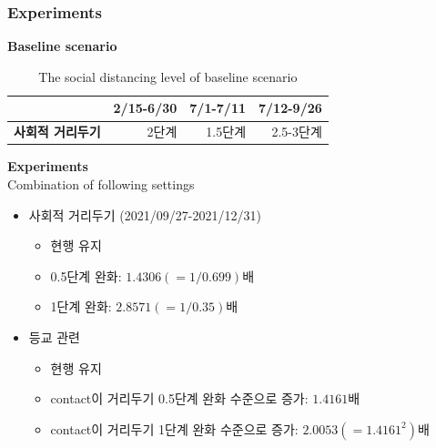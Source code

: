 \documentclass[aspectratio=169, 9pt, xcolor=dvipsnames]{beamer}
\begin{document}
	\begin{frame}\frametitle{Experiments}
		\textbf{Baseline scenario}
	    \begin{table}
	    	\begin{tabular}{crrr}
	    		\toprule
	    		 & \textbf{2/15-6/30} & \textbf{7/1-7/11} & \textbf{7/12-9/26} \\
	    		\midrule
	    		\textbf{사회적 거리두기} & 2단계 & 1.5단계 & 2.5-3단계 \\
	    		\bottomrule
	    	\end{tabular}
	    	\caption{The social distancing level of baseline scenario}
	    \end{table}
	    \textbf{Experiments} \\
	    Combination of following settings
	    \begin{itemize}
	    	\item 사회적 거리두기 (2021/09/27-2021/12/31)
	    	\begin{itemize}
	    		\item 현행 유지
	    		\item 0.5단계 완화: $1.4306(=1/0.699)$배
	    		\item 1단계 완화: $2.8571(=1/0.35)$배
	    	\end{itemize}
	    	\item 등교 관련
	    	\begin{itemize}
	    		\item 현행 유지
	    		\item contact이 거리두기 0.5단계 완화 수준으로 증가: $1.4161$배
	    		\item contact이 거리두기 1단계 완화 수준으로 증가: $2.0053(=1.4161^2)$배
	    	\end{itemize}
	    \end{itemize}
	\end{frame}
\end{document}
